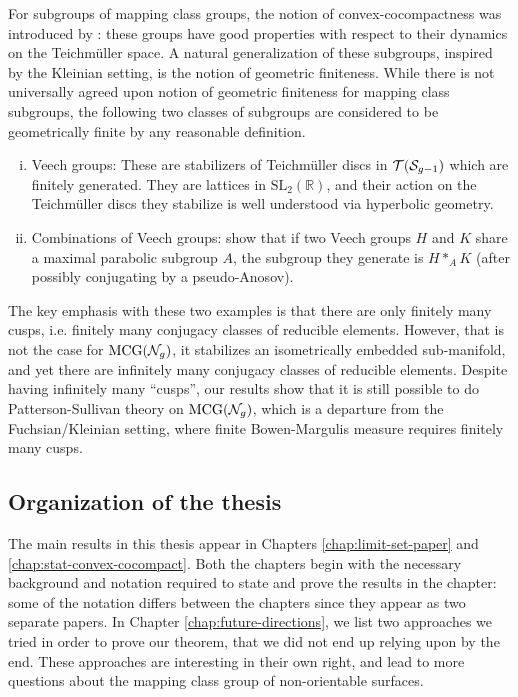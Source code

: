 For subgroups of mapping class groups, the notion of convex-cocompactness was introduced by \textcite{farb2002convex}: these groups have good properties with respect to their dynamics on the Teichmüller space.
A natural generalization of these subgroups, inspired by the Kleinian setting, is the notion of geometric finiteness.
While there is not universally agreed upon notion of geometric finiteness for mapping class subgroups, the following two classes of subgroups are considered to be geometrically finite by any reasonable definition.

\begin{enumerate}[(i)]
\item Veech groups: These are stabilizers of Teichmüller discs in $\mathcal{T}(\mathcal{S}_{g-1})$ which are finitely generated.
  They are lattices in $\mathrm{SL}_2(\mathbb{R})$, and their action on the Teichmüller discs they stabilize is well understood via hyperbolic geometry.
\item Combinations of Veech groups: \textcite{leininger2006combination} show that if two Veech groups $H$ and $K$ share a maximal parabolic subgroup $A$, the subgroup they generate is $H \ast_A K$ (after possibly conjugating by a pseudo-Anosov).
\end{enumerate}

The key emphasis with these two examples is that there are only finitely many cusps, i.e. finitely many conjugacy classes of reducible elements.
However, that is not the case for $\mathrm{MCG}(\mathcal{N}_g)$, it stabilizes an isometrically embedded sub-manifold, and yet there are infinitely many conjugacy classes of reducible elements.
Despite having infinitely many ``cusps'', our results show that it is still possible to do Patterson-Sullivan theory on $\mathrm{MCG}(\mathcal{N}_g)$, which is a departure from the Fuchsian/Kleinian setting, where finite Bowen-Margulis measure requires finitely many cusps.


\subsection*{Organization of the thesis}

The main results in this thesis appear in Chapters \ref{chap:limit-set-paper} and \ref{chap:stat-convex-cocompact}.
Both the chapters begin with the necessary background and notation required to state and prove the results in the chapter: some of the notation differs between the chapters since they appear as two separate papers.
In Chapter \ref{chap:future-directions}, we list two approaches we tried in order to prove our theorem, that we did not end up relying upon by the end.
These approaches are interesting in their own right, and lead to more questions about the mapping class group of non-orientable surfaces.

